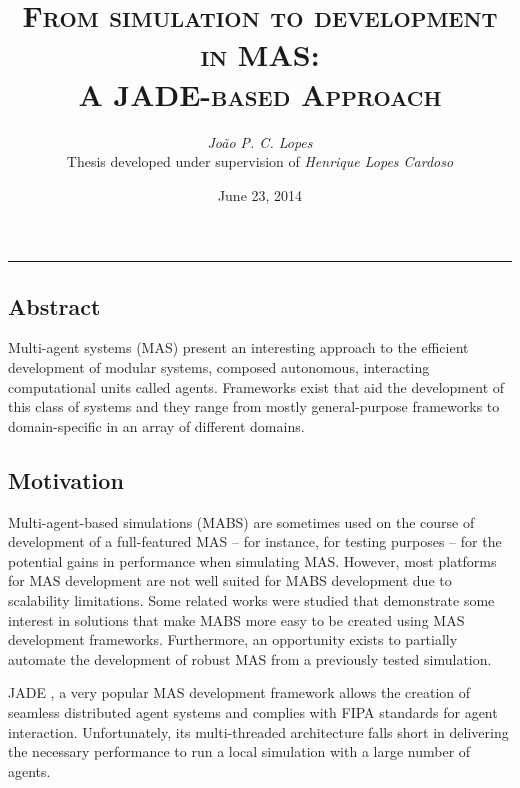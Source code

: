 \documentclass[9pt,a4paper]{extarticle}
\begin{document}
\title{\vspace*{-8mm}\textbf{\textsc{
  From simulation to development in MAS:\\
  A JADE-based Approach
}}}
\author{
  \emph{João P. C. Lopes}\\[2mm]
  \small{Thesis developed under supervision of \emph{Henrique Lopes Cardoso}}
}
\date{June 23, 2014}
\maketitle
\thispagestyle{empty}

\vspace*{-4mm}\noindent\rule{\textwidth}{0.4pt}\vspace*{4mm}

\begin{multicols}{2}

\section{Abstract}

Multi-agent systems (MAS) present an interesting approach to the efficient development of modular systems, composed autonomous, interacting computational units called agents. Frameworks exist that aid the development of this class of systems and they range from mostly general-purpose frameworks to domain-specific in an array of different domains.

\subsection{Motivation}
Multi-agent-based simulations (MABS) are sometimes used on the course of development of a full-featured MAS -- for instance, for testing purposes -- for the potential gains in performance when simulating MAS. 
However, most platforms for MAS development are not well suited for MABS development due to scalability limitations\cite{mengistu2008scalability}. Some related works were studied that demonstrate some interest in solutions that make MABS more easy to be created using MAS development frameworks. Furthermore, an opportunity exists to partially automate the development of robust MAS from a previously tested simulation.

JADE \cite{bellifemine2007developing}, a very popular MAS development framework allows the creation of seamless distributed agent systems and complies with FIPA standards for agent interaction. Unfortunately, its multi-threaded architecture falls short in delivering the necessary performance to run a local simulation with a large number of agents.


\end{multicols}
\end{document}
